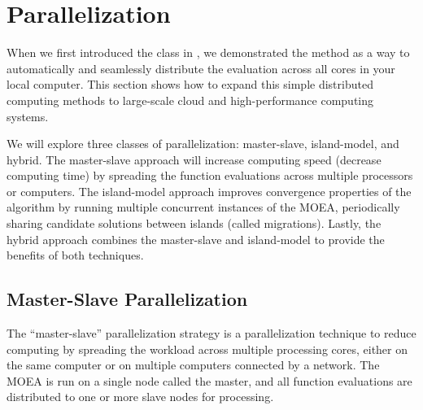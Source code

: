 %
%

\chapter{Parallelization}
\label{chpt:parallelization}

When we first introduced the  class in , we demonstrated the  method as a way to automatically and seamlessly distribute the evaluation across all cores in your local computer.  This section shows how to expand this simple distributed computing methods to large-scale cloud and high-performance computing systems.

We will explore three classes of parallelization: master-slave, island-model, and hybrid.  The master-slave approach will increase computing speed (decrease computing time) by spreading the function evaluations across multiple processors or computers.  The island-model approach improves convergence properties of the algorithm by running multiple concurrent instances of the MOEA, periodically sharing candidate solutions between islands (called migrations).  Lastly, the hybrid approach combines the master-slave and island-model to provide the benefits of both techniques.

\section{Master-Slave Parallelization}
\label{sect:masterSlave}

The ``master-slave'' parallelization strategy is a parallelization technique to reduce computing by spreading the workload across multiple processing cores, either on the same computer or on multiple computers connected by a network.  The MOEA is run on a single node called the master, and all function evaluations are distributed to one or more slave nodes for processing.

